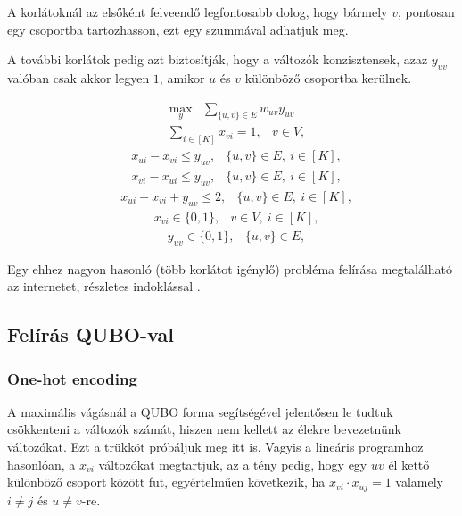 A korlátoknál az elsőként felveendő legfontosabb dolog, hogy bármely $v$, pontosan egy csoportba tartozhasson, ezt egy szummával adhatjuk meg.

A további korlátok pedig azt biztosítják, hogy a változók konzisztensek, azaz  $y_{uv}$ valóban csak akkor legyen $1$, amikor  $u$ és $v$ különböző csoportba kerülnek.

\begin{align} \max _{y} &\sum _{\{{u,v}\} \in E} w_{uv}y_{uv} \end{align}
\begin{align} &\sum _{i \in [K]} x_{vi} = 1,&v \in V, \end{align}
\begin{align}&x_{ui} - x_{vi} \le y_{uv},&\{{u,v}\} \in E, \ i\in [K],\end{align}
\begin{align}&x_{vi} - x_{ui} \le y_{uv},&\{{u,v}\} \in E, \ i\in [K], \end{align}
\begin{align}&x_{ui} + x_{vi} + y_{uv} \le 2,&\{{u,v}\} \in E, \ i\in [K],\end{align}
\begin{align}&x_{vi} \in \{{0,1}\} ,&v \in V, \ i\in [K],\end{align}
\begin{align}&y_{uv} \in \{{0,1}\} ,&\{{u,v}\} \in E,\end{align}

Egy ehhez nagyon hasonló (több korlátot igénylő) probléma felírása megtalálható az internetet, részletes indoklással \cite{Hojny2021}. 

\subsection{Felírás QUBO-val}

\subsubsection{One-hot encoding}

A maximális vágásnál a QUBO forma segítségével jelentősen le tudtuk csökkenteni a változók számát, hiszen nem kellett az élekre bevezetnünk változókat. Ezt a trükköt próbáljuk meg itt is.
Vagyis a lineáris programhoz hasonlóan, a $x_{vi}$ változókat megtartjuk, az a tény pedig, hogy egy $uv$ él kettő különböző csoport között fut, egyértelműen következik, ha $x_{vi} \cdot x_{uj}=1$ valamely $i \neq j$ és $u \neq v$-re.


